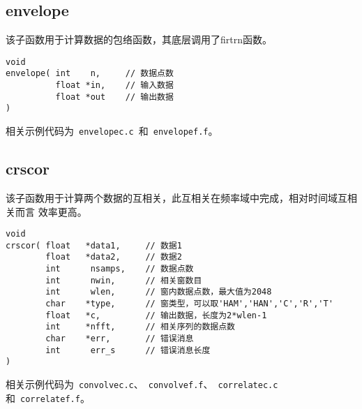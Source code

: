 \subsection{envelope}
该子函数用于计算数据的包络函数，其底层调用了firtrn函数。
\begin{lstlisting}[style=C]
void                                                                                
envelope( int    n,     // 数据点数
          float *in,    // 输入数据
          float *out    // 输出数据
)
\end{lstlisting}

相关示例代码为~\lstinline{envelopec.c}~和~\lstinline{envelopef.f}。

\subsection{crscor}
该子函数用于计算两个数据的互相关，此互相关在频率域中完成，相对时间域互相关而言
效率更高。

\begin{lstlisting}[style=C]
void                                                                                  
crscor( float   *data1,     // 数据1
        float   *data2,     // 数据2                                       
        int      nsamps,    // 数据点数                                               
        int      nwin,      // 相关窗数目                                            
        int      wlen,      // 窗内数据点数，最大值为2048
        char    *type,      // 窗类型，可以取'HAM','HAN','C','R','T'
        float   *c,         // 输出数据，长度为2*wlen-1
        int     *nfft,      // 相关序列的数据点数                            
        char    *err,       // 错误消息                                  
        int      err_s      // 错误消息长度
)
\end{lstlisting}

相关示例代码为~\lstinline{convolvec.c}、~\lstinline{convolvef.f}、~\lstinline{correlatec.c}~
和~\lstinline{correlatef.f}。
